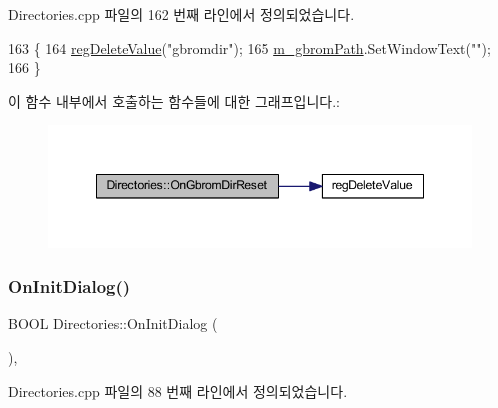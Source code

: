 Directories.\+cpp 파일의 162 번째 라인에서 정의되었습니다.


\begin{DoxyCode}
163 \{
164   \mbox{\hyperlink{_reg_8cpp_aa7b7490d17e18a60838a58482114fd75}{regDeleteValue}}(\textcolor{stringliteral}{"gbromdir"});
165   \mbox{\hyperlink{class_directories_adffa22cb6f6be3c0b7327670dd885f83}{m\_gbromPath}}.SetWindowText(\textcolor{stringliteral}{""});  
166 \}
\end{DoxyCode}
이 함수 내부에서 호출하는 함수들에 대한 그래프입니다.\+:
\nopagebreak
\begin{figure}[H]
\begin{center}
\leavevmode
\includegraphics[width=348pt]{class_directories_aa323eb09c0caba8b8e5ff7984fd8e2e6_cgraph}
\end{center}
\end{figure}
\mbox{\label{class_directories_a53964c598a5541b1d65cfee62e5d8587}} 
\subsubsection{\texorpdfstring{On\+Init\+Dialog()}{OnInitDialog()}}
{\footnotesize\ttfamily B\+O\+OL Directories\+::\+On\+Init\+Dialog (\begin{DoxyParamCaption}{ }\end{DoxyParamCaption})\hspace{0.3cm}{\ttfamily [protected]}, {\ttfamily [virtual]}}



Directories.\+cpp 파일의 88 번째 라인에서 정의되었습니다.


